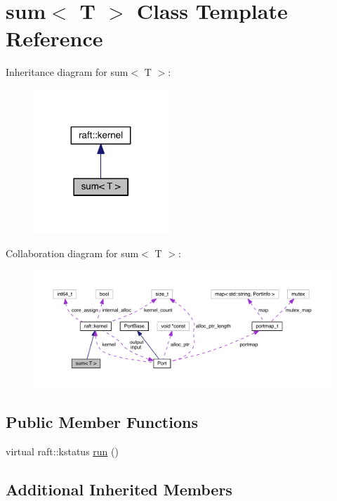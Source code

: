 \hypertarget{classsum}{}\section{sum$<$ T $>$ Class Template Reference}
\label{classsum}


Inheritance diagram for sum$<$ T $>$\+:
\nopagebreak
\begin{figure}[H]
\begin{center}
\leavevmode
\includegraphics[width=143pt]{classsum__inherit__graph}
\end{center}
\end{figure}


Collaboration diagram for sum$<$ T $>$\+:
\nopagebreak
\begin{figure}[H]
\begin{center}
\leavevmode
\includegraphics[width=350pt]{classsum__coll__graph}
\end{center}
\end{figure}
\subsection*{Public Member Functions}
\begin{DoxyCompactItemize}
\item 
virtual raft\+::kstatus \hyperlink{classsum_a2d0fac9129b826678d00520621937b15}{run} ()
\end{DoxyCompactItemize}
\subsection*{Additional Inherited Members}


